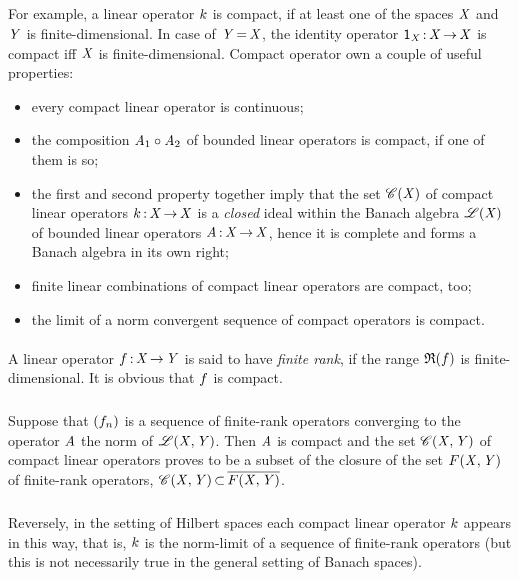 \documentclass[11pt,twoside]{article}
\begin{document}
\subparagraph{}
For example,
a linear operator $k$ is compact,
if at least one of the spaces $\mathit{X}$ and $\mathit{Y}$ is finite-dimensional.
In case of $\mathit{Y} {\,=\,} \mathit{X}$,
the identity operator ${\mathsf{1}}_{\mathit{X}} {\,:\,} \mathit{X} {\,\to\,} \mathit{X}$ is compact
iff $\mathit{X}$ is finite-dimensional.
Compact operator own a couple of useful properties:

\begin{itemize}[leftmargin=9mm]
\item[(a)]
every compact linear operator is continuous;

\item[(b)]
the composition $\mathit{A}_1 \circ \mathit{A}_2$ of bounded linear operators
is compact,
if one of them is so;

\item[(c)]
the first and second property together imply that
the set $\mathscr{C}(\mathit{X})$ of compact linear operators $k{\,:\,}\mathit{X} {\,\to\,} \mathit{X}$
is a \textit{closed} ideal within the Banach algebra $\mathscr{L}(\mathit{X}) $
of bounded linear operators $\mathit{A} {\,:\,} \mathit{X} {\,\to\,} \mathit{X}$,
hence it is complete and forms a Banach algebra in its own right;

\item[(d)]
finite linear combinations of compact linear operators are compact, too;

\item[(e)]
the limit of a norm convergent sequence of compact operators is compact.
\end{itemize}

\paragraph{} %
A linear operator $f {\,:\,} \mathit{X} {\,\to\,} \mathit{Y}$ is said
to have \textit{finite rank},
if the range $\mathfrak{R}(f)$ is finite-dimensional.
It is obvious that $f$ is compact.

\subparagraph{}
Suppose that $(f_n)$ is a sequence of finite-rank operators
converging to the operator $\mathit{A}$ {\wrt} the norm of $\mathscr{L}(\mathit{X},\mathit{Y})$.
Then $\mathit{A}$ is compact
and the set $\mathscr{C}(\mathit{X},\mathit{Y})$ of compact linear operators
proves to be a subset of the closure of the set $F(\mathit{X},\mathit{Y})$
of finite-rank operators,
{\ie}
$\mathscr{C}(\mathit{X},\mathit{Y}) {\,\subset\,} \overline{F(\mathit{X},\mathit{Y})}$.

\subparagraph{}
Reversely,
in the setting of Hilbert spaces 
each compact linear operator $k$ appears in this way,
that is,
$k$ is the norm-limit of a sequence of finite-rank operators
(but this is not necessarily true in the general setting of Banach spaces).
\end{document}
